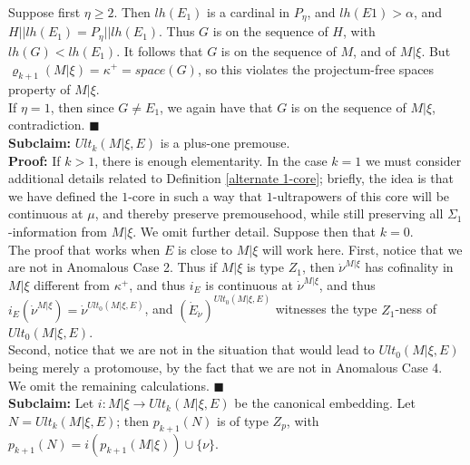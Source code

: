 \documentclass[12pt]{article}
\begin{document}
Suppose first $\eta \geq 2$.  Then $lh(E_1)$ is a cardinal in $P_\eta$, and $lh(E1) > \alpha$, and $H || lh(E_1) = P_\eta || lh(E_1)$.  Thus $G$ is on the sequence of $H$, with $lh (G) < lh(E_1)$.  It follows that $G$ is on the sequence of $M$, and of $M | \xi$.  But $\varrho_{k+1} (M | \xi) = \kappa^+ = space (G)$, so this violates the projectum-free spaces property of $M | \xi$.\\

If $\eta = 1$, then since $G \neq E_1$, we again have that $G$ is on the sequence of $M | \xi$, contradiction. $\blacksquare$\\

\textbf{Subclaim:} $Ult_k ( M | \xi , E)$ is a plus-one premouse.\\

\indent \indent \textbf{Proof:} If $k > 1$, there is enough elementarity.  In the case $k=1$ we must consider additional details related to Definition \ref{alternate 1-core}; briefly, the idea is that we have defined the $1$-core in such a way that $1$-ultrapowers of this core will be continuous at $\mu$, and thereby preserve premousehood, while still preserving all $\Sigma_1$-information from $M| \xi$.  We omit further detail.  Suppose then that $k = 0$.\\

The proof that works when $E$ is close to $M | \xi$ will work here.  First, notice that we are not in Anomalous Case 2.  Thus if $M | \xi$ is type $Z_1$, then $\dot{\nu}^{M | \xi}$ has cofinality in $M | \xi$ different from $\kappa^+$, and thus $i_E$ is continuous at $\dot{\nu}^{M | \xi}$, and thus $i_E (\dot{\nu}^{M | \xi}) = \dot{\nu}^{Ult_0 (M | \xi , E )}$, and $(\dot{E}_{\dot{\nu}})^{Ult_0 ( M | \xi , E)}$ witnesses the type $Z_1$-ness of $Ult_0 (M | \xi , E)$.\\

Second, notice that we are not in the situation that would lead to $Ult_0 (M | \xi, E)$ being merely a protomouse, by the fact that we are not in Anomalous Case 4.\\

We omit the remaining calculations. $\blacksquare$\\

\textbf{Subclaim:} Let $i: M | \xi \longrightarrow Ult_k (M | \xi , E )$ be the canonical embedding.  Let $N = Ult_k (M | \xi , E )$; then $p_{k+1} (N)$ is of type $Z_p$, with $p_{k+1} (N) = i (p_{k+1} (M | \xi )) \cup \{ \nu \}$.\\
\end{document}

